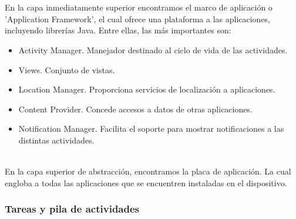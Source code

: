 \\
\\
En la capa inmediatamente superior encontramos el marco de aplicación o 'Application Framework', el cual ofrece una plataforma a las aplicaciones, incluyendo librerías Java. Entre ellas, las más importantes son:
\begin{itemize}
\item Activity Manager. Manejador destinado al ciclo de vida de las actividades.
\item Views. Conjunto de vistas.
\item Location Manager. Proporciona servicios de localización a aplicaciones.
\item Content Provider. Concede accesos a datos de otras aplicaciones.
\item Notification Manager. Facilita el soporte para mostrar notificaciones a las distintas actividades.
\end{itemize}
\\
En la capa superior de abstracción, encontramos la placa de aplicación. La cual engloba a todas las aplicaciones que se encuentren instaladas en el dispositivo.
\\
\subsubsection{Tareas y pila de actividades}

